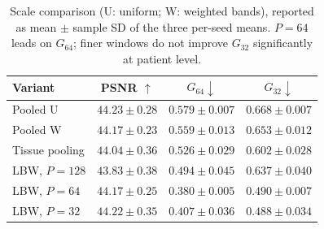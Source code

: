 \begin{table}[t]
\centering
\caption{Scale comparison (U: uniform; W: weighted bands), reported as mean $\pm$ sample SD of the three per-seed means. $P=64$ leads on $G_{64}$; finer windows do not improve $G_{32}$ significantly at patient level.}
\label{tab:locality}
\setlength{\tabcolsep}{1.8pt}
\begin{tabular}{lccc}
\toprule
Variant & PSNR $\uparrow$ & $G_{64}\downarrow$ & $G_{32}\downarrow$ \\
\midrule
Pooled U & $\mathbf{44.23\pm0.28}$ & $0.579\pm0.007$ & $0.668\pm0.007$ \\
Pooled W & $44.17\pm0.23$ & $0.559\pm0.013$ & $0.653\pm0.012$ \\
Tissue pooling & $44.04\pm0.36$ & $0.526\pm0.029$ & $0.602\pm0.028$ \\
LBW, $P=128$ & $43.83\pm0.38$ & $0.494\pm0.045$ & $0.637\pm0.040$ \\
LBW, $P=64$ & $44.17\pm0.25$ & $\mathbf{0.380\pm0.005}$ & $0.490\pm0.007$ \\
LBW, $P=32$ & $44.22\pm0.35$ & $0.407\pm0.036$ & $\mathbf{0.488\pm0.034}$ \\
\bottomrule
\end{tabular}
\end{table}
